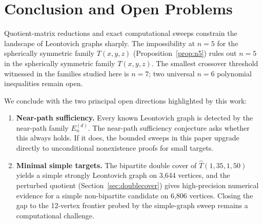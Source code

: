 \section{Conclusion and Open Problems}
\label{sec:conclusion}

Quotient-matrix reductions and exact computational sweeps constrain the
landscape of Leontovich graphs sharply. The impossibility at $n=5$ for
the spherically symmetric family $T(x,y,z)$
(Proposition~\ref{prop:n5}) rules out $n=5$ in the spherically symmetric
family $T(x,y,z)$. The smallest crossover threshold witnessed in the
families studied here is $n=7$; two universal $n=6$ polynomial
inequalities remain open.

We conclude with the two principal open directions highlighted by this work:

\begin{enumerate}
  \item \textbf{Near-path sufficiency.} Every known Leontovich graph is
    detected by the near-path family $E_n^{(d)}$. The near-path
    sufficiency conjecture asks whether this always holds. If it does,
    the bounded sweeps in this paper upgrade directly to unconditional
    nonexistence proofs for small targets.
  \item \textbf{Minimal simple targets.} The bipartite double cover of
    $\hat{T}(1,35,1,50)$ yields a simple strongly Leontovich graph on
    3,644 vertices, and the perturbed quotient
    (Section~\ref{sec:doublecover}) gives high-precision numerical evidence
    for a simple non-bipartite candidate on 6,806 vertices. Closing the
    gap to the 12-vertex frontier probed by the simple-graph sweep
    remains a computational challenge.
\end{enumerate}

